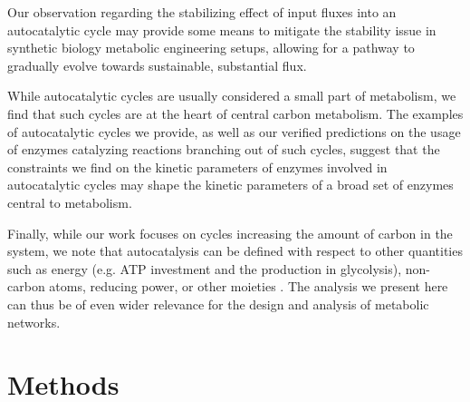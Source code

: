 Our observation regarding the stabilizing effect of input fluxes into an autocatalytic cycle may provide some means to mitigate the stability issue in synthetic biology metabolic engineering setups, allowing for a pathway to gradually evolve towards sustainable, substantial flux.

While autocatalytic cycles are usually considered a small part of metabolism, we find that such cycles are at the heart of central carbon metabolism.
The examples of autocatalytic cycles we provide, as well as our verified predictions on the usage of enzymes catalyzing reactions branching out of such cycles, suggest that the constraints we find on the kinetic parameters of enzymes involved in autocatalytic cycles may shape the kinetic parameters of a broad set of enzymes central to metabolism.

  Finally, while our work focuses on cycles increasing the amount of carbon in the system, we note that autocatalysis can be defined with respect to other quantities such as energy (e.g. ATP investment and the production in glycolysis), non-carbon atoms, reducing power, or other moieties \cite{Reich1981-qd}.
  The analysis we present here can thus be of even wider relevance for the design and analysis of metabolic networks.

  \section{Methods}
